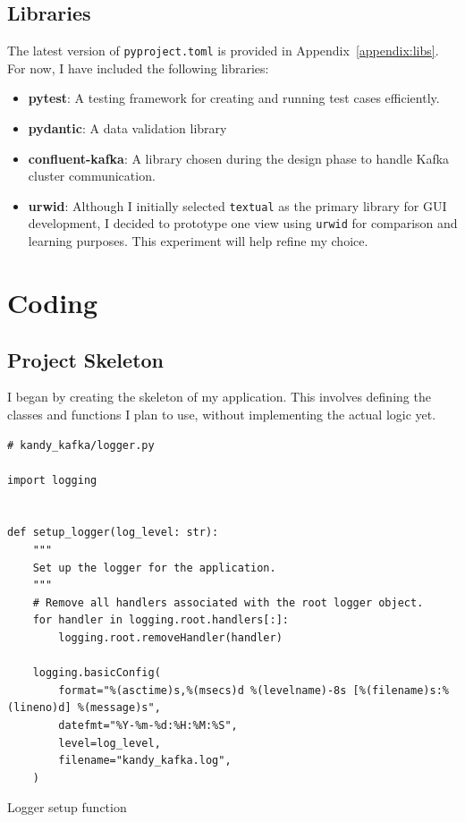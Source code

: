 \documentclass[10pt , a4paper]{report}
\newenvironment{code}{\captionsetup{type=listing}}{}
\begin{document}
\subsection{Libraries}

The latest version of \texttt{pyproject.toml} is provided in Appendix~\ref{appendix:libs}. For now, I have included the following libraries:

\begin{itemize}
  \item \textbf{pytest}: A testing framework for creating and running test cases efficiently.
  \item \textbf{pydantic}: A data validation library
  \item \textbf{confluent-kafka}: A library chosen during the design phase to handle Kafka cluster communication.
  \item \textbf{urwid}: Although I initially selected \texttt{textual} as the primary library for GUI development, I decided to prototype one view using \texttt{urwid} for comparison and learning purposes. This experiment will help refine my choice.
\end{itemize}

\newpage

\section{Coding}
\subsection{Project Skeleton}

I began by creating the skeleton of my application. This involves defining the classes and functions I plan to use, without implementing the actual logic yet.


\begin{code}
  \begin{verbatim}
# kandy_kafka/logger.py

import logging


def setup_logger(log_level: str):
    """
    Set up the logger for the application.
    """
    # Remove all handlers associated with the root logger object.
    for handler in logging.root.handlers[:]:
        logging.root.removeHandler(handler)

    logging.basicConfig(
        format="%(asctime)s,%(msecs)d %(levelname)-8s [%(filename)s:%(lineno)d] %(message)s",
        datefmt="%Y-%m-%d:%H:%M:%S",
        level=log_level,
        filename="kandy_kafka.log",
    )
  \end{verbatim}
\caption{Logger setup function}
\end{code}
\end{document}

